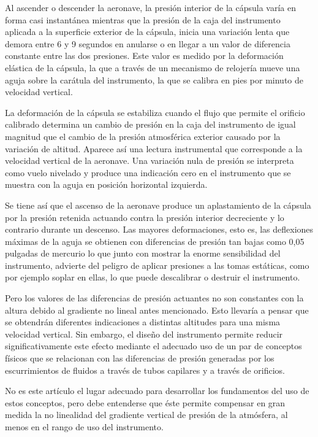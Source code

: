 \documentclass{article}
\begin{document}
Al ascender o descender la aeronave, la presión interior de la cápsula varía en forma casi instantánea mientras que la presión de la caja del instrumento aplicada a la superficie exterior de la cápsula, inicia una variación lenta que demora entre 6 y 9 segundos en anularse o en llegar a un valor de diferencia constante entre las dos presiones. Este valor es medido por la deformación elástica de la cápsula, la que a través de un mecanismo de relojería mueve una aguja sobre la carátula del instrumento, la que se calibra en pies por minuto de velocidad vertical.

La deformación de la cápsula se estabiliza cuando el flujo que permite el orificio calibrado determina un cambio de presión en la caja del instrumento de igual magnitud que el cambio de la presión atmosférica exterior causado por la variación de altitud. Aparece así una lectura instrumental que corresponde a la velocidad vertical de la aeronave. Una variación nula de presión se interpreta como vuelo nivelado y produce una indicación cero en el instrumento que se muestra con la aguja en posición horizontal izquierda.

Se tiene así que el ascenso de la aeronave produce un aplastamiento de la cápsula por la presión retenida actuando contra la presión interior decreciente y lo contrario durante un descenso. Las mayores deformaciones, esto es, las deflexiones máximas de la aguja se obtienen con diferencias de presión tan bajas como 0,05 pulgadas de mercurio lo que junto con mostrar la enorme sensibilidad del instrumento, advierte del peligro de aplicar presiones a las tomas estáticas, como por ejemplo soplar en ellas, lo que puede descalibrar o destruir el instrumento.

Pero los valores de las diferencias de presión actuantes no son constantes con la altura debido al gradiente no lineal antes mencionado. Esto llevaría a pensar que se obtendrán diferentes indicaciones a distintas altitudes para una misma velocidad vertical. Sin embargo, el diseño del instrumento permite reducir significativamente este efecto mediante el adecuado uso de un par de conceptos físicos que se relacionan con las diferencias de presión generadas por los escurrimientos de fluidos a través de tubos capilares y a través de orificios.

No es este artículo el lugar adecuado para desarrollar los fundamentos del uso de estos conceptos, pero debe entenderse que éste permite compensar en gran medida la no linealidad del gradiente vertical de presión de la atmósfera, al menos en el rango de uso del instrumento.
\end{document}
